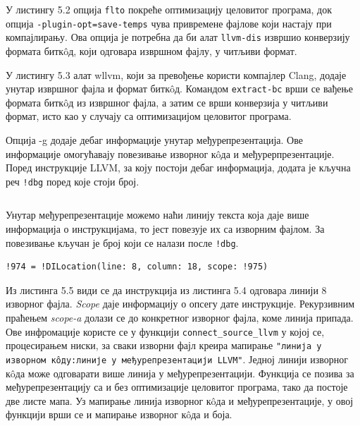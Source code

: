 \documentclass[12pt,oneside]{memoir}
\begin{document}
У листингу 5.2 опција \texttt{flto} покреће оптимизацију целовитог програма,
док опција \texttt{-plugin-opt=save-temps} чува привремене фајлове који настају
при компајлирању.
Ова опција је потребна да би алат \texttt{llvm-dis} извршио конверзију формата битк\^{o}д,
који одговара извршном фајлу, у читљиви формат.

У листингу 5.3 алат wllvm, који за превођење користи компајлер Clang, додаје унутар извршног фајла и формат битк\^{o}д. 
Командом \texttt{extract-bc} врши се вађење формата битк\^{o}д из извршног фајла, а затим се врши конверзија у читљиви формат, исто као у случају са оптимизацијом
целовитог програма.

Опција -g додаје дебаг информације унутар међурепрезентација.
Ове информације омогућавају повезивање изворног к\^{o}да и међурерпрезентације.
Поред инструкције LLVM, за коју постоји дебаг информација, додата је кључна реч
\texttt{!dbg} поред које стоји број.
\begin{lstlisting}[frame=single, caption=Пример debug кључне речи, captionpos=b]
  %4 = mul nsw i32 %0, %0, !dbg !974
\end{lstlisting}
Унутар међурепрезентације можемо наћи линију текста која даје више информација о
инструкцијама, то јест повезује их са изворним фајлом.
За повезивање кључан је број који се налази после \texttt{!dbg}.
\begin{lstlisting}[frame=single, caption=Пример debug линије која повезује изворни к\^{o}д са међурепрезентацијом, captionpos=b]
!974 = !DILocation(line: 8, column: 18, scope: !975)
\end{lstlisting}
Из листинга 5.5 види се да инструкција из листинга 5.4 одговара линији 8 изворног фајла.
\textit{Scope} даје информацију о опсегу дате инструкције.
Рекурзивним праћењем \textit{scope-a} долази се до конкретног изворног фајла, коме линија припада.
Ове инфромације користе се у функцији \texttt{connect\_source\_llvm} у којој се, 
процесирањем ниски, 
за сваки изворни фајл креира мапирање \texttt{"линија у изворном к\^{o}ду:линије у 
међурепрезентацији LLVM"}.
Једној линији изворног к\^{o}да може одговарати више линија у међурепрезентацији.
Функција се позива за међурепрезентацију са и без оптимизације целовитог програма, 
тако да постоје две листе мапа.
Уз мапирање линија  изворног к\^{o}да и међурепрезентације, у овој функцији врши
се и мапирање изворног к\^{o}да и боја.
\end{document}
